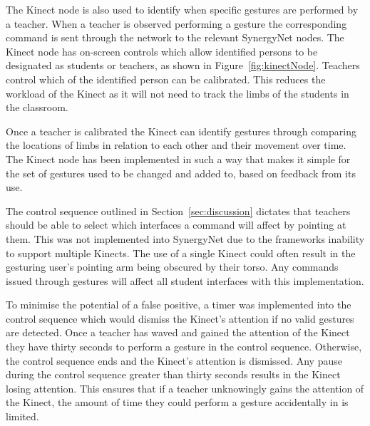 \documentclass[manuscript, review, screen]{acmart}
\begin{document}
The Kinect node is also used to identify when specific gestures are performed by a teacher.
When a teacher is observed performing a gesture the corresponding command is sent through the network to the relevant SynergyNet nodes.
The Kinect node has on-screen controls which allow identified persons to be designated as students or teachers, as shown in Figure~\ref{fig:kinectNode}.
Teachers control which of the identified person can be calibrated.
This reduces the workload of the Kinect as it will not need to track the limbs of the students in the classroom.

Once a teacher is calibrated the Kinect can identify gestures through comparing the locations of limbs in relation to each other and their movement over time.
The Kinect node has been implemented in such a way that makes it simple for the set of gestures used to be changed and added to, based on feedback from its use.

The control sequence outlined in Section~\ref{sec:discussion} dictates that teachers should be able to select which interfaces a command will affect by pointing at them.
This was not implemented into SynergyNet due to the frameworks inability to support multiple Kinects.
The use of a single Kinect could often result in the gesturing user's pointing arm being obscured by their torso.
Any commands issued through gestures will affect all student interfaces with this implementation.

To minimise the potential of a false positive, a timer was implemented into the control sequence which would dismiss the Kinect's attention if no valid gestures are detected.
Once a teacher has waved and gained the attention of the Kinect they have thirty seconds to perform a gesture in the control sequence.
Otherwise, the control sequence ends and the Kinect's attention is dismissed.
Any pause during the control sequence greater than thirty seconds results in the Kinect losing attention.
This ensures that if a teacher unknowingly gains the attention of the Kinect, the amount of time they could perform a gesture accidentally in is limited.
\end{document}
